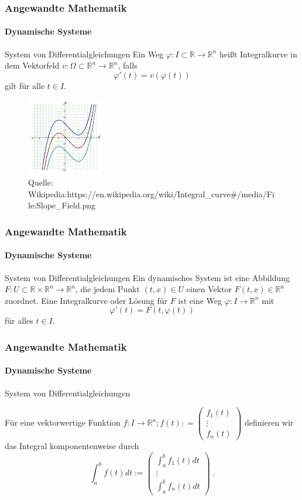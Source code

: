 \documentclass{beamer}
\begin{document}
\begin{frame}
    \frametitle{Angewandte Mathematik}
\framesubtitle{Dynamische Systeme }
\begin{block}{System von Differentialgleichungen}
Ein Weg $\varphi : I \subset \mathbb{R} \to \mathbb{R}^n$ heißt Integralkurve in dem Vektorfeld $v : \Omega \subset \mathbb{R}^n \to \mathbb{R}^n$, falls 
$$\varphi' (t) = v(\varphi(t))$$ gilt für alle $t \in  I$.
\end{block}
\begin{figure}[H]
      \centering
    \includegraphics[width=0.3\textwidth]{images/Slope_Field.png}
\caption{Quelle: Wikipedia:https://en.wikipedia.org/wiki/Integral\_curve\#/media/File:Slope\_Field.png}
\end{figure}

 \end{frame}


\begin{frame}
    \frametitle{Angewandte Mathematik}
\framesubtitle{Dynamische Systeme }
\begin{block}{System von Differentialgleichungen}
Ein dynamisches System ist eine  Abbildung $F : U \subset \mathbb{R} \times \mathbb{R}^n \to \mathbb{R}^n$, die jedem Punkt $(t,x)  \in U$ einen Vektor $F(t,x) \in \mathbb{R}^n$ zuordnet. Eine Integralkurve oder Lösung für $F$ ist eine Weg $\varphi : I \to \mathbb{R}^n$ mit 
$$\varphi'(t) = F(t, \varphi(t)) $$
für alles $t \in I$.
\end{block}
 \end{frame}


\begin{frame}
    \frametitle{Angewandte Mathematik}
\framesubtitle{Dynamische Systeme }
\begin{block}{System von Differentialgleichungen}

Für eine  vektorwertige Funktion  $f : I   \to \mathbb{R}^n; f(t) : = \begin{pmatrix} f_1(t)  \\ \vdots \\ f_n(t) \end{pmatrix}$ definieren wir das Integral komponentenweise durch
$$\int_{a}^{b}  f(t) dt := \begin{pmatrix} \int_{a}^{b}  f_1(t) dt  \\ \vdots \\ \int_{a}^{b}  f_n(t) dt \end{pmatrix} \; .$$
\end{block}
 \end{frame}
\end{document}
